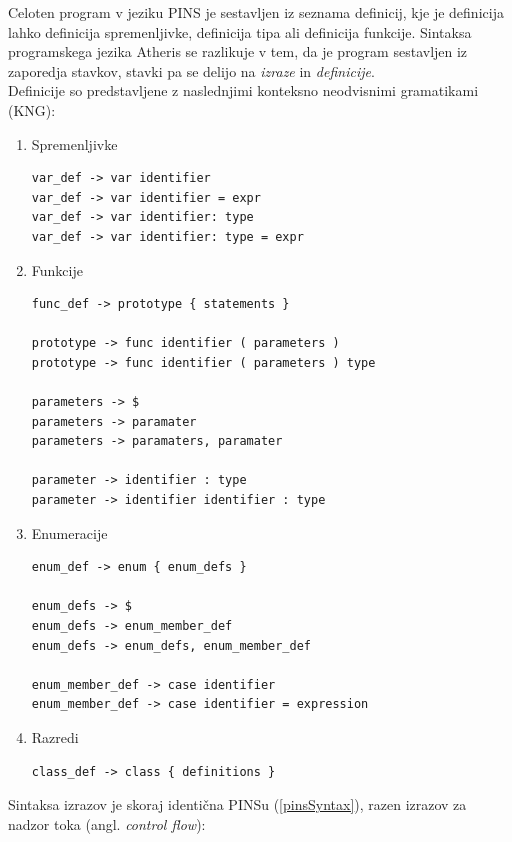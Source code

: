 \documentclass[a4paper, 12p]{book}
\begin{document}
Celoten program v jeziku PINS je sestavljen iz seznama definicij, kje je definicija lahko definicija spremenljivke, definicija tipa ali definicija funkcije. Sintaksa programskega jezika Atheris se razlikuje v tem, da je program sestavljen iz zaporedja stavkov, stavki pa se delijo na \textit{izraze} in \textit{definicije}. \\
\indent Definicije so predstavljene z naslednjimi konteksno neodvisnimi gramatikami (KNG):
 
\begin{enumerate}
	\item Spremenljivke
\begin{lstlisting}[]
var_def -> var identifier 
var_def -> var identifier = expr
var_def -> var identifier: type 
var_def -> var identifier: type = expr 
\end{lstlisting}
	\item Funkcije
\begin{lstlisting}[]
func_def -> prototype { statements }

prototype -> func identifier ( parameters )
prototype -> func identifier ( parameters ) type

parameters -> $
parameters -> paramater
parameters -> paramaters, paramater

parameter -> identifier : type
parameter -> identifier identifier : type
\end{lstlisting}	
	\item Enumeracije
	
\begin{lstlisting}
enum_def -> enum { enum_defs }

enum_defs -> $
enum_defs -> enum_member_def
enum_defs -> enum_defs, enum_member_def

enum_member_def -> case identifier
enum_member_def -> case identifier = expression
\end{lstlisting}
	\item Razredi
\begin{lstlisting}
class_def -> class { definitions }
\end{lstlisting}

\end{enumerate} 

\newpage
Sintaksa izrazov je skoraj identična PINSu (\ref{pinsSyntax}), razen izrazov za nadzor toka (angl. \textit{control flow}):
\end{document}
